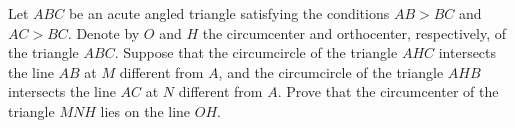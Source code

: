 Let $ABC$ be an acute angled triangle satisfying the conditions $AB>BC$ and $AC>BC$. Denote by $O$ and $H$ the circumcenter and orthocenter, respectively, of the triangle $ABC.$ Suppose that the circumcircle of the triangle $AHC$ intersects the line $AB$ at $M$ different from $A$, and the circumcircle of the triangle $AHB$ intersects the line $AC$ at $N$ different from $A.$ Prove that the circumcenter of the triangle $MNH$ lies on the line $OH$.